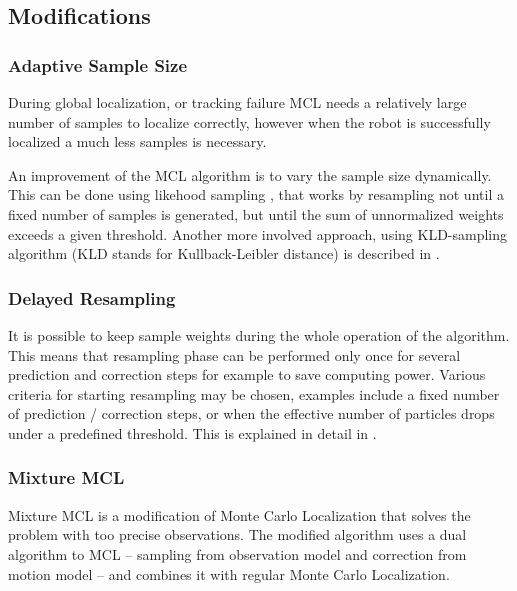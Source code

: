 \subsection{Modifications}

\subsubsection{Adaptive Sample Size}
During global localization, or tracking failure MCL needs a relatively large number
of samples to localize correctly, however when the robot is successfully localized
a much less samples is necessary.

An improvement of the MCL algorithm is to vary the sample size dynamically.
This can be done using likehood sampling \cite{fox99}, that works by 
resampling not until a fixed number of samples is
generated, but until the sum of unnormalized weights exceeds a given threshold.
Another more involved approach, using KLD-sampling algorithm
(KLD stands for Kullback-Leibler distance) is described in \cite{fox03}.

\subsubsection{Delayed Resampling}
It is possible to keep sample weights during the whole operation of the algorithm.
This means that resampling phase can be performed only once for several prediction and correction steps
for example to save computing power.
Various criteria for starting resampling may be chosen, examples include a fixed number of
prediction / correction steps, or when the effective number of particles drops under a predefined threshold.
This is explained in detail in \cite{arulampalam01}.

\subsubsection{Mixture MCL}

Mixture MCL \cite{thrun99} is a modification of Monte Carlo Localization that
solves the problem with too precise observations.
The modified algorithm uses a dual algorithm to MCL -- sampling from
observation model and correction from motion model -- and combines it with
regular Monte Carlo Localization.
